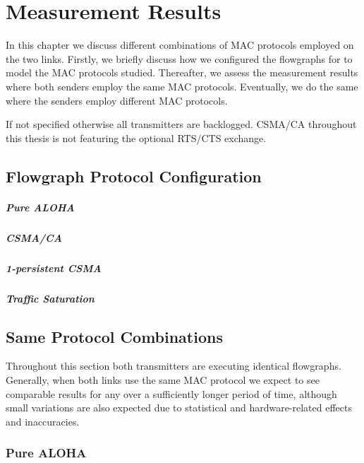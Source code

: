 \chapter{Measurement Results}

In this chapter we discuss different combinations of MAC protocols employed on the two links. Firstly, we briefly discuss how we configured the flowgraphs for to model the MAC protocols studied. Thereafter, we assess the measurement results where both senders employ the same MAC protocols. Eventually, we do the same where the senders employ different MAC protocols. 

If not specified otherwise all transmitters are backlogged. CSMA/CA throughout this thesis is not featuring the optional RTS/CTS exchange.

\section{Flowgraph Protocol Configuration}

\paragraph{Pure ALOHA}

\paragraph{CSMA/CA}

\paragraph{1-persistent CSMA}

\paragraph{Traffic Saturation}


\section{Same Protocol Combinations}

Throughout this section both transmitters are executing identical flowgraphs. Generally, when both links use the same MAC protocol we expect to see comparable results for any over a sufficiently longer period of time, although small variations are also expected due to statistical and hardware-related effects and inaccuracies. 

\subsection{Pure ALOHA}

